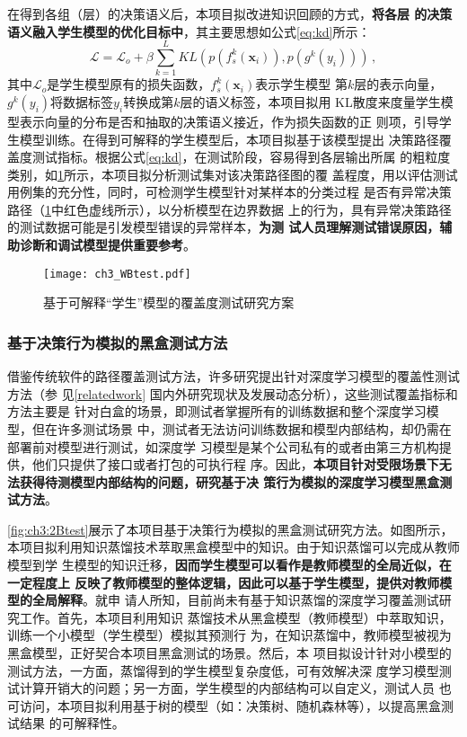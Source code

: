 在得到各组（层）的决策语义后，本项目拟改进知识回顾的方式，\textbf{将各层
的决策语义融入学生模型的优化目标中}，其主要思想如公式\eqref{eq:kd}所示：
\begin{equation}
    \mathcal{L} = \mathcal{L}_o + \beta\sum_{k=1}^L KL(p(f_s^k(\bm x_i)), p(g^k(y_i))) \,,
    \label{eq:kd}
\end{equation}
其中$\mathcal L_o$是学生模型原有的损失函数，$f_s^k(\bm x_i)$表示学生模型
第$k$层的表示向量，$g^k(y_i)$将数据标签$y_i$转换成第$k$层的语义标签，本项目拟用
KL散度来度量学生模型表示向量的分布是否和抽取的决策语义接近，作为损失函数的正
则项，引导学生模型训练。在得到可解释的学生模型后，本项目拟基于该模型提出
决策路径覆盖度测试指标。根据公式\eqref{eq:kd}，在测试阶段，容易得到各层输出所属
的粗粒度类别，{如\cref{fig:ch3:WBtest}所示，本项目拟分析测试集对该决策路径图的覆
盖程度，用以评估测试用例集的充分性，同时，可检测学生模型针对某样本的分类过程
是否有异常决策路径（\cref{fig:ch3:WBtest}中红色虚线所示），以分析模型在边界数据
上的行为}，具有异常决策路径的测试数据可能是引发模型错误的异常样本，\textbf{为测
    试人员理解测试错误原因，辅助诊断和调试模型提供重要参考}。
\begin{figure}[htp]
    \begin{small}
        \begin{center}
            \texttt{[image: ch3\_WBtest.pdf]}
        \end{center}
        \caption{基于可解释``学生''模型的覆盖度测试研究方案}
        \label{fig:ch3:WBtest}
    \end{small}
\end{figure}

\subsubsection{基于决策行为模拟的黑盒测试方法}\label{ch3_1}

借鉴传统软件的路径覆盖测试方法，许多研究提出针对深度学习模型的覆盖性测试方法（参
见\ref{relatedwork} 国内外研究现状及发展动态分析），这些测试覆盖指标和方法主要是
针对白盒的场景，即测试者掌握所有的训练数据和整个深度学习模型，但在许多测试场景
中，测试者无法访问训练数据和模型内部结构，却仍需在部署前对模型进行测试，如深度学
习模型是某个公司私有的或者由第三方机构提供，他们只提供了接口或者打包的可执行程
序。因此，\textbf{本项目针对受限场景下无法获得待测模型内部结构的问题，研究基于决
策行为模拟的深度学习模型黑盒测试方法}。

\cref{fig:ch3:2Btest}展示了本项目基于决策行为模拟的黑盒测试研究方法。如图所示，
本项目拟利用知识蒸馏技术萃取黑盒模型中的知识。由于知识蒸馏可以完成从教师模型到学
生模型的知识迁移，\textbf{因而学生模型可以看作是教师模型的全局近似，在一定程度上
反映了教师模型的整体逻辑，因此可以基于学生模型，提供对教师模型的全局解释}。就申
请人所知，目前尚未有基于知识蒸馏的深度学习覆盖测试研究工作。首先，本项目利用知识
蒸馏技术从黑盒模型（教师模型）中萃取知识，训练一个小模型（学生模型）模拟其预测行
为，在知识蒸馏中，教师模型被视为黑盒模型，正好契合本项目黑盒测试的场景。然后，本
项目拟设计针对小模型的测试方法，一方面，蒸馏得到的学生模型复杂度低，可有效解决深
度学习模型测试计算开销大的问题；另一方面，学生模型的内部结构可以自定义，测试人员
也可访问，本项目拟利用基于树的模型（如：决策树、随机森林等），以提高黑盒测试结果
的可解释性。

